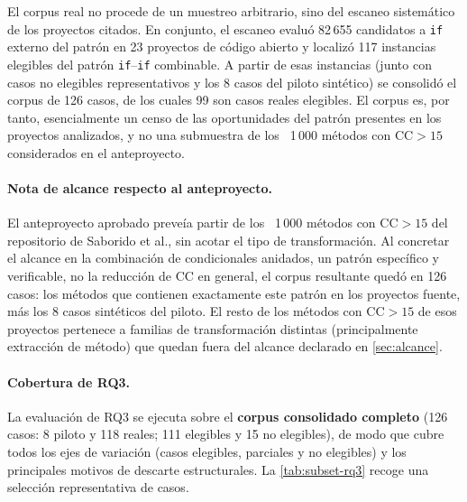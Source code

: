 El corpus real no procede de un
muestreo arbitrario, sino del escaneo sistemático de los proyectos citados. En
conjunto, el escaneo evaluó 82\,655 candidatos a \texttt{if} externo del patrón
en 23 proyectos de código abierto y localizó 117 instancias elegibles del patrón
\texttt{if}--\texttt{if} combinable. A partir de esas instancias (junto con
casos no elegibles representativos y los 8 casos del piloto sintético) se
consolidó el corpus de 126 casos, de los cuales 99 son casos reales elegibles.
El corpus es, por tanto, esencialmente un censo de las oportunidades del patrón
presentes en los proyectos analizados, y no una submuestra de los
\emph{~}1\,000 métodos con $\text{CC}>15$ considerados en el anteproyecto.

\paragraph{Nota de alcance respecto al anteproyecto.} El anteproyecto aprobado
preveía partir de los \emph{~}1\,000 métodos con $\text{CC}>15$ del repositorio
de Saborido et al., sin acotar el tipo de transformación. Al concretar el
alcance en la combinación de condicionales anidados, un patrón específico y
verificable, no la reducción de CC en general, el corpus resultante quedó en
126 casos: los métodos que contienen exactamente este patrón en los proyectos
fuente, más los 8 casos sintéticos del piloto. El resto de los métodos con
$\text{CC}>15$ de esos proyectos pertenece a familias de transformación
distintas (principalmente extracción de método) que quedan fuera del alcance
declarado en \autoref{sec:alcance}.


\paragraph{Cobertura de RQ3.} La evaluación de RQ3 se ejecuta sobre el
\textbf{corpus consolidado completo} (126 casos: 8 piloto y 118 reales; 111
elegibles y 15 no elegibles), de modo que cubre todos los ejes de variación
(casos elegibles, parciales y no elegibles) y los principales motivos de descarte estructurales.
La \autoref{tab:subset-rq3} recoge una selección representativa de casos.


